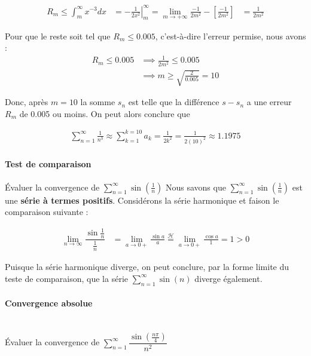 \documentclass{report}
\newcommand*\Eval[3]{\left.#1\right\rvert_{#2}^{#3}}
\begin{document}
\begin{multicols*}{2}
  \begin{align*}
    R_m \leq \int_{m}^{\infty }x^{-3}dx 
    & =  \Eval{-\frac{1}{2x^2}}{m}{\infty}  
      = \lim\limits_{m \to+\infty }\frac{-1}{2m^2} -\left[ \frac{-1}{2m^2} \right] 
    & = \frac{1}{2m^2} 
  \end{align*}

  Pour que le reste soit tel que $R_m \leq 0.005$, 
  c'est-à-dire l'erreur
  permise, nous avons :
  \begin{align*}
    R_m \leq 0.005 &\implies \frac{1}{2m^2} \leq 0.005 \\   
                   &\implies m \geq \sqrt{\frac{2}{0.005}} = 10 
  \end{align*}

  Donc, après $m = 10$ la somme $s_n$ est telle 
  que la différence 
  $s - s_n$ a une erreur $R_m$ de 0.005 ou moins. 
  On peut alors conclure que 
  
  \begin{align*}
    \sum_{n=1}^{\infty }\frac{1}{n^3} \approx \sum_{k=1}^{k = 10} a_k = 
    \frac{1}{2k^2} = \frac{1}{2(10)^2} \approx 1.1975
  \end{align*}


  \paragraph{Test de comparaison} Évaluer la convergence de 
  $\sum_{n=1}^{\infty }\sin\left( \frac{1}{n}  \right) $
  Nous savons que $\sum_{n=1}^{\infty } \sin \left(\frac{1}{n} \right)$ est une 
  \textbf{série à termes positifs}.   
  Considérons la série harmonique et faison le comparaison suivante : 

  \begin{align*}
    \lim\limits_{n \to \infty } \dfrac{\sin \frac{1}{n} }{\frac{1}{n} }  
    &= 
    \lim\limits_{a \to 0 + } \frac{\sin a}{a}   
    \overset{\mathcal{H} }{=} \lim\limits_{a \to 0+} \frac{\cos a}{1} 
    = 1 > 0
  \end{align*}

  Puisque la série harmonique diverge, on peut conclure, 
  par la forme limite 
  du teste de comparaison, que la série $\sum_{n=1}^{\infty }\sin(n)$ diverge 
  également. 

  \paragraph{Convergence absolue}
  \mbox{}\\
  Évaluer la convergence de $\sum_{n=1}^{\infty }
  \dfrac{\sin \left(\frac{n\pi}{4}\right)}{n^2}$ 


\end{multicols*}
\end{document}
